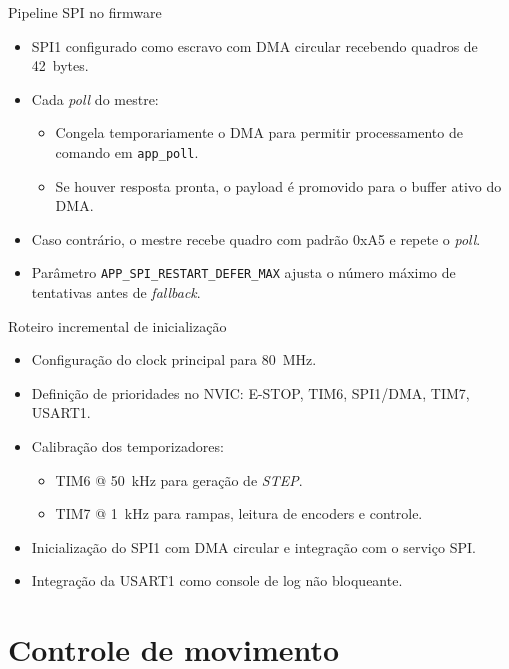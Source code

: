 \documentclass{beamer}
\begin{document}
\begin{frame}{Pipeline SPI no firmware}
  \begin{itemize}
    \item SPI1 configurado como escravo com DMA circular recebendo quadros de 42~bytes.
    \item Cada \emph{poll} do mestre:
      \begin{itemize}
        \item Congela temporariamente o DMA para permitir processamento de comando em \texttt{app\_poll}.
        \item Se houver resposta pronta, o payload é promovido para o buffer ativo do DMA.
      \end{itemize}
    \item Caso contrário, o mestre recebe quadro com padrão 0xA5 e repete o \emph{poll}.
    \item Parâmetro \texttt{APP\_SPI\_RESTART\_DEFER\_MAX} ajusta o número máximo de tentativas antes de \emph{fallback}.
  \end{itemize}
\end{frame}

\begin{frame}{Roteiro incremental de inicialização}
  \begin{itemize}
    \item Configuração do clock principal para \SI{80}{\mega\hertz}.
    \item Definição de prioridades no NVIC: E-STOP, TIM6, SPI1/DMA, TIM7, USART1.
    \item Calibração dos temporizadores:
      \begin{itemize}
        \item TIM6 @ 50~kHz para geração de \emph{STEP}.
        \item TIM7 @ 1~kHz para rampas, leitura de encoders e controle.
      \end{itemize}
    \item Inicialização do SPI1 com DMA circular e integração com o serviço SPI.
    \item Integração da USART1 como console de log não bloqueante.
  \end{itemize}
\end{frame}

\section{Controle de movimento}
\end{document}
